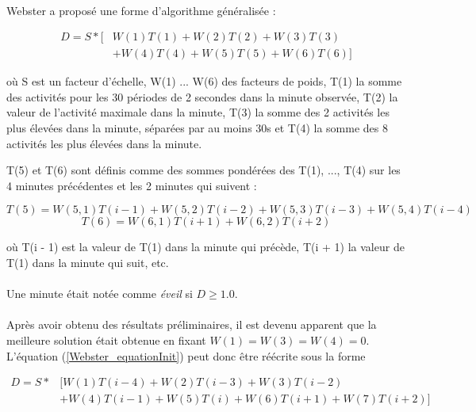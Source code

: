 \documentclass[a4paper,10pt]{article}
\begin{document}
\paragraph{}
Webster a proposé une forme d'algorithme généralisée :

\begin{equation}
\label{Webster_equationInit}
\begin{split}
D = S * [&W(1)T(1) + W(2) T(2) + W(3) T(3) \\
         &+ W(4) T(4) + W(5) T(5) + W(6) T(6)]
\end{split}
\end{equation} 

où S est un facteur d'échelle, W(1) ... W(6) des facteurs de poids, T(1) la somme des activités pour les 30 périodes de 2 secondes dans la minute observée, T(2) la valeur de l'activité maximale dans la minute, T(3) la somme des 2 activités les plus élevées dans la minute, séparées par au moins 30s et T(4) la somme des 8 activités les plus élevées dans la minute.

T(5) et T(6) sont définis comme des sommes pondérées des T(1), ..., T(4) sur les 4 minutes précédentes et les 2 minutes qui suivent :

\begin{equation}
T(5) = W(5, 1) T(i - 1) + W(5,2) T(i - 2) + W(5, 3) T(i - 3) + W(5, 4) T(i - 4)
\end{equation}
\begin{equation}
T(6) = W(6, 1) T(i + 1) + W(6, 2) T(i + 2)
\end{equation}

où T(i - 1) est la valeur de T(1) dans la minute qui précède, T(i + 1) la valeur de T(1) dans la minute qui suit, etc.

\paragraph{}
Une minute était notée comme \textit{éveil} si $D \geq 1.0$.

\paragraph{}
Après avoir obtenu des résultats préliminaires, il est devenu apparent que la meilleure solution était obtenue en fixant $W(1) = W(3) = W(4) = 0$. L'équation (\ref{Webster_equationInit}) peut donc être réécrite sous la forme

\begin{equation}
\begin{split}
D = S * &[W(1) T(i-4) + W(2) T(i - 3) + W(3) T(i - 2)\\
         &+ W(4) T(i - 1) + W(5) T(i) + W(6) T(i+1) + W(7) T(i+2)]
\end{split}
\end{equation}
\end{document}

